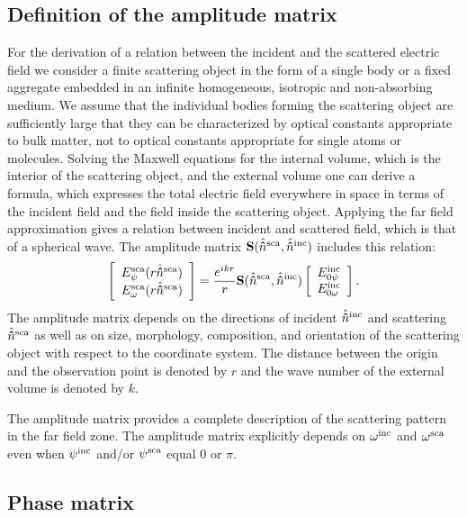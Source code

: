 \subsection{Definition of the amplitude matrix}
\label{sec:rtetheory:amp_mat}

For the derivation of a relation between the incident and the
scattered electric field we consider a finite scattering object in the
form of a single body or a fixed aggregate embedded in an infinite
homogeneous, isotropic and non-absorbing medium. We assume that the
individual bodies forming the scattering object are sufficiently large
that they can be characterized by optical constants appropriate to
bulk matter, not to optical constants appropriate for single atoms or
molecules. Solving the Maxwell equations for the internal volume,
which is the interior of the scattering object, and the external
volume one can derive a formula, which expresses the total electric
field everywhere in space in terms of the incident field and the field
inside the scattering object. Applying the far field approximation
gives a relation between incident and scattered field, which is that
of a spherical wave.  The amplitude matrix
$\mathbf{S}(\hat{{\bf \hat{n}}}^{\mathrm{sca}},\hat{{\bf \hat{n}}}^{\mathrm{inc}})$ includes this relation:
\begin{equation}
  \label{eq:rtetheory:amplitude_matrix}
  \ColVctTwo{E_\ZntAng^{\sca}(r\hat{\PDir}^{\sca})}%
         {E_\AzmAng^{\sca}(r\hat{\PDir}^{\sca})}
         = \frac{e^{ikr}}{r}\MtrStl{S}(\hat{\PDir}^{\sca},\hat{\PDir}^{\inc}) 
 \ColVctTwo{E_{0\ZntAng}^{\inc}}%
         {E_{0\AzmAng}^{\inc}}.
\end{equation}
The amplitude matrix depends on the directions of incident
$\hat{{\bf \hat{n}}}^{\mathrm{inc}}$ and scattering $\hat{{\bf \hat{n}}}^{\mathrm{sca}}$ as well as on size,
morphology, composition, and orientation of the scattering object with
respect to the coordinate system. The distance between the origin and
the observation point is denoted by $r$ and the wave number of the
external volume is denoted by $k$.

The amplitude matrix provides a complete description of the scattering
pattern in the far field zone. The amplitude matrix explicitly depends
on $\omega^{\mathrm{inc}}$ and $\omega^{\mathrm{sca}}$ even when $\psi^{\mathrm{inc}}$ and/or
$\psi^{\mathrm{sca}}$ equal 0 or $\pi$.

\subsection{Phase matrix}
\label{sec:rtetheory:pha_mat}

